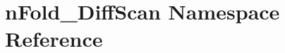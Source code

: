 \hypertarget{namespacenFold__DiffScan}{
\section{nFold\_\-DiffScan Namespace Reference}
\label{namespacenFold__DiffScan}
}
